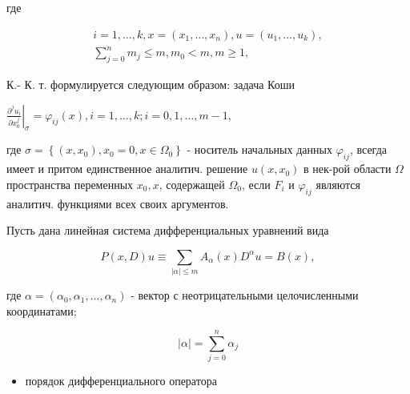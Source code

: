 \documentclass[10pt]{article}
\begin{document}
где



\[

\begin{gathered}

i=1, \ldots, k, x=\left(x_{1}, \ldots, x_{n}\right), u=\left(u_{1}, \ldots, u_{k}\right), \\

\sum_{j=0}^{n} m_{j} \leqslant m, m_{0}<m, m \geqslant 1,

\end{gathered}

\]



К.- К. т. формулируется следующим образом: задача Коши



$\left.\frac{\partial^{j} u_{i}}{\partial x_{0}^{j}}\right|_{\sigma}=\varphi_{i j}(x), i=1, \ldots, k ; i=0,1, \ldots, m-1$,



где $\sigma=\left\{\left(x, x_{0}\right), x_{0}=0, x \in \Omega_{0}\right\}$ - носитель начальных данных $\varphi_{i j}$, всегда имеет и притом единственное аналитич. решение $u\left(x, x_{0}\right)$ в нек-рой области $\Omega$ пространства переменных $x_{0}, x$, содержащей $\Omega_{0}$, если $F_{i}$ и $\varphi_{i j}$ являются аналитич. функциями всех своих аргументов.



Пусть дана линейная система дифференциальных уравнений вида



\[

P(x, D) u \equiv \sum_{|\alpha| \leqslant m} A_{\alpha}(x) D^{\alpha} u=B(x),

\]



где $\alpha=\left(\alpha_{0}, \alpha_{1}, \ldots, \alpha_{n}\right)$ - вектор с неотрицательными целочисленными координатами;



\[

|\alpha|=\sum_{j=0}^{n} \alpha_{j}

\]



\begin{itemize}

  \item порядок дифференциального оператора

\end{itemize}
\end{document}
